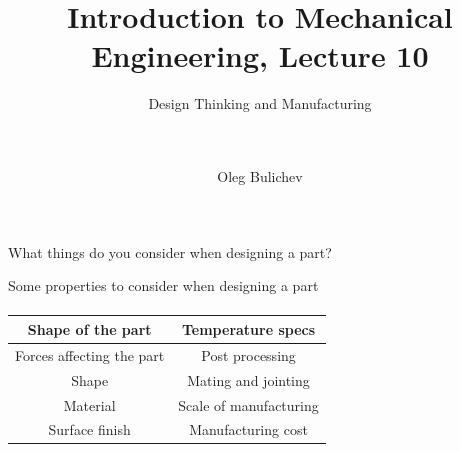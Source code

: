 \documentclass[aspectratio=169]{beamer}
\title[IME]{Introduction to Mechanical Engineering, Lecture 10} %
\subtitle{Design Thinking and Manufacturing  
\\ \   \\   
\ } %
\author{Oleg Bulichev}
\newcommand{\fbckg}[1]{\usebackgroundtemplate{\texttt{[image: \#1]}}}%
\begin{document}
\setlength{\abovedisplayskip}{0pt}
\setlength{\belowdisplayskip}{0pt}
\setlength{\abovedisplayshortskip}{0pt}
\setlength{\belowdisplayshortskip}{0pt}

\fbckg{fibeamer/figs/title_page.png}

\fbckg{fibeamer/figs/common.png}

\note{\scriptsize \begin{itemize}
        \item \
    \end{itemize}}

\begin{frame}[c]{}
    \framesubtitle{}
        \LARGE \centering
        What things do you consider when designing a part?
    \end{frame}

\begin{frame}[c]{Some properties to consider when designing a part}
\framesubtitle{}
\begin{table}[H]
    \LARGE
    \centering
    \begin{tabular}{|c|c|}
    \hline
        \textbf{Shape of the part} & \textbf{Temperature specs} \\ \hline
        Forces affecting the part & Post processing \\ 
        Shape & Mating and jointing \\ 
        Material & Scale of manufacturing \\ 
        Surface finish & Manufacturing cost \\ \hline
    \end{tabular}
\end{table}
\end{frame}
\end{document}
